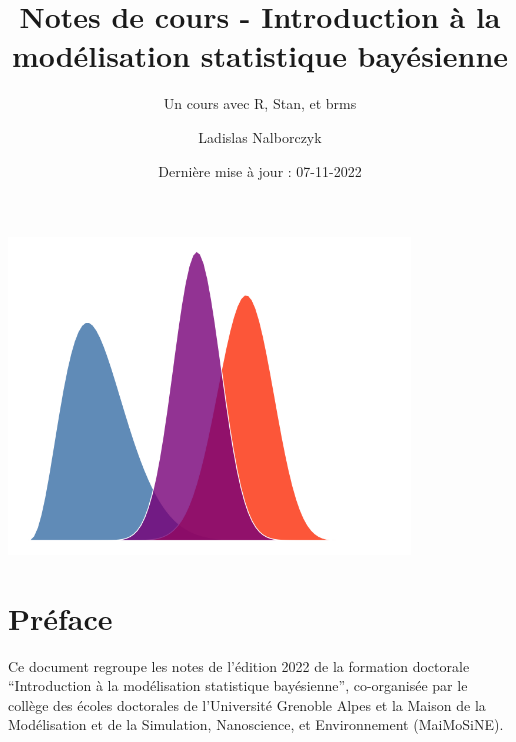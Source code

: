\documentclass[
  a4paper,11pt,twoside,onecolumn,openright,final,oldfontcommands]{memoir}
\title{Notes de cours - Introduction à la modélisation statistique bayésienne}
\subtitle{Un cours avec R, Stan, et brms}
\author{Ladislas Nalborczyk}
\date{Dernière mise à jour : 07-11-2022}
\newcommand\blankpage{%
    \null
    \thispagestyle{empty}%
    \newpage
    }
\theoremstyle{definition}
\theoremstyle{definition}
\theoremstyle{definition}
\theoremstyle{definition}
\theoremstyle{remark}
\begin{document}
\maketitle


\thispagestyle{empty}


\begin{center} %

  \includegraphics[width=0.8\textwidth]{figures/cover_distributions.png}

\end{center}

\newpage
\blankpage %

\OnehalfSpacing %


{
\hypersetup{linkcolor=}
\setcounter{tocdepth}{2}
\tableofcontents
}
\hypertarget{pruxe9face}{%
\chapter*{Préface}\label{pruxe9face}}


Ce document regroupe les notes de l'édition 2022 de la formation doctorale ``Introduction à la modélisation statistique bayésienne'', co-organisée par le collège des écoles doctorales de l'Université Grenoble Alpes et la Maison de la Modélisation et de la Simulation, Nanoscience, et Environnement (MaiMoSiNE).
\end{document}
